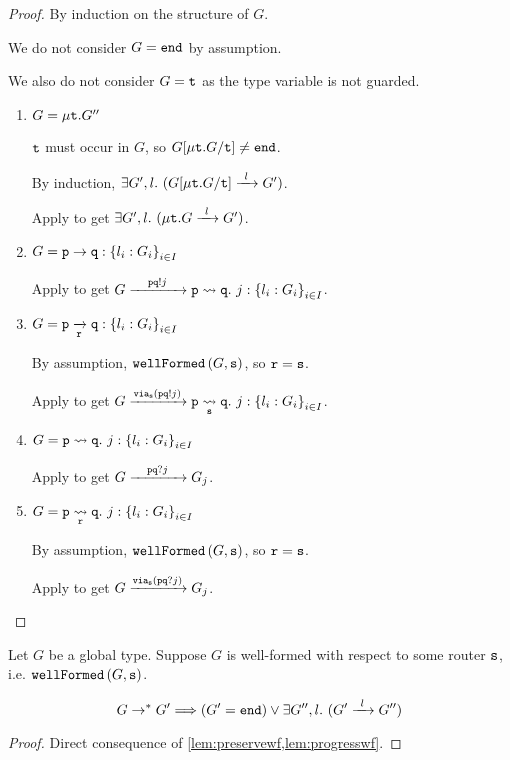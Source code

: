 \begin{proof}
By induction on the structure of $G$.

We do not consider $G = \tend$ by assumption.

We also do not consider $G = \trecvar$ as the type variable is not guarded.

\begin{enumerate}

\item $G = \trec{G''}$

$\trecvar$ must occur in $G$, so $G[\trec{G} / \trecvar] \neq \tend$.

By induction, 
$\exists G', l. ~ (\treduce{G[\trec{G} / \trecvar]}{G'}{l})$.

Apply  to get 
$\exists G', l. ~ (\treduce{\trec{G}}{G'}{l})$.

\item $G = \gcomm{p}{q}{l_i: G_i}{i \in I}$

Apply  to get 
$\treducelong
	{G}
	{\gtrans{p}{q}{j}{l_i: G_i}{i \in I}}
	{\aout{p}{q}{j}}$.

\item $G = \groute{p}{q}{r}{l_i: G_i}{i \in I}$

By assumption, $\wfnew{G}{s}$, so $\mrole{r} = \mrole{s}$.

Apply  to get
$\treducelong
	{G}
	{\gtransroute{p}{q}{s}{j}{l_i: G_i}{i \in I}}
	{\via{s}{\aout{p}{q}{j}}}$.

\item $G = \gtrans{p}{q}{j}{l_i: G_i}{i \in I}$

Apply  to get 
$\treducelong
	{G}
	{G_j}
	{\ain{p}{q}{j}}$.

\item $G = \gtransroute{p}{q}{r}{j}{l_i: G_i}{i \in I}$

By assumption, $\wfnew{G}{s}$, so $\mrole{r} = \mrole{s}$.

Apply  to get
$\treducelong
	{G}
	{G_j}
	{\via{s}{\ain{p}{q}{j}}}$.

\end{enumerate}

\end{proof}

\begin{theorem}
Let $G$ be a global type.
Suppose $G$ is well-formed with respect to some router $\mrole{s}$,
i.e. $\wfnew{G}{s}$.

\[
G \to^* G'
	\Longrightarrow
(G' = \tend) \vee \exists G'', l. ~ 
	(\treduce{G'}{G''}{l})
\]

\end{theorem}

\begin{proof}
Direct consequence of 
\cref{lem:preservewf,lem:progresswf}.
\end{proof}